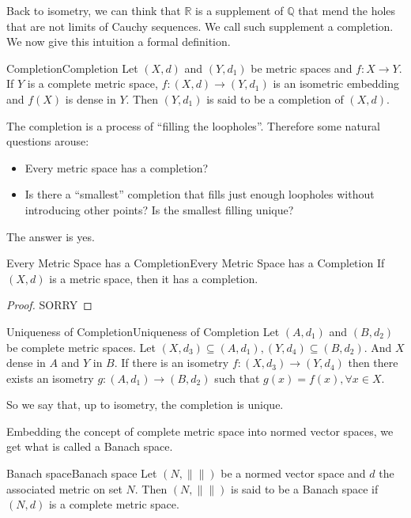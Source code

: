 \documentclass[../main.tex]{subfiles}
\begin{document}
Back to isometry, we can think that $\mathbb{R}$ is a supplement of $\mathbb{Q}$ that mend the holes that are not limits of Cauchy sequences. We call such supplement a completion. We now give this intuition a formal definition.
\begin{definition}{Completion}{Completion}
Let $(X,d)$ and $(Y,d_1)$ be metric spaces and $f:X \rightarrow Y$. If $Y$ is a complete metric space, $f:(X,d) \rightarrow (Y,d_1)$ is an isometric embedding and $f(X)$ is dense in $Y$. Then $(Y,d_1)$ is said to be a completion of $(X,d)$.
\end{definition}

\begin{remark}
The completion is a process of ``filling the loopholes''. Therefore some natural questions arouse: 
\begin{itemize}
\item Every metric space has a completion?
\item Is there a ``smallest'' completion that fills just enough loopholes without introducing other points? Is the smallest filling unique?
\end{itemize}
The answer is yes.
\end{remark}

\begin{theorem}{Every Metric Space has a Completion}{Every Metric Space has a Completion}
If $(X,d)$ is a metric space, then it has a completion.
\end{theorem}
\begin{proof}
SORRY
\end{proof}

\begin{theorem}{Uniqueness of Completion}{Uniqueness of Completion}
Let $(A,d_1)$ and $(B,d_2)$ be complete metric spaces. Let $(X,d_3) \subseteq (A,d_1), (Y,d_4)\subseteq (B,d_2)$. And $X$ dense in $A$ and $Y$ in $B$. If there is an isometry $f:(X,d_3)\rightarrow (Y,d_4)$ then there exists an isometry $g:(A,d_1)\rightarrow (B,d_2)$ such that $g(x)=f(x),\forall x\in X$.

So we say that, up to isometry, the completion is unique.
\end{theorem}

Embedding the concept of complete metric space into normed vector spaces, we get what is called a Banach space.
\begin{definition}{Banach space}{Banach space}
Let $(N,\|\|)$ be a normed vector space and $d$ the associated metric on set $N$. Then $(N,\|\|)$ is said to be a Banach space if $(N,d)$ is a complete metric space.
\end{definition}
\end{document}
